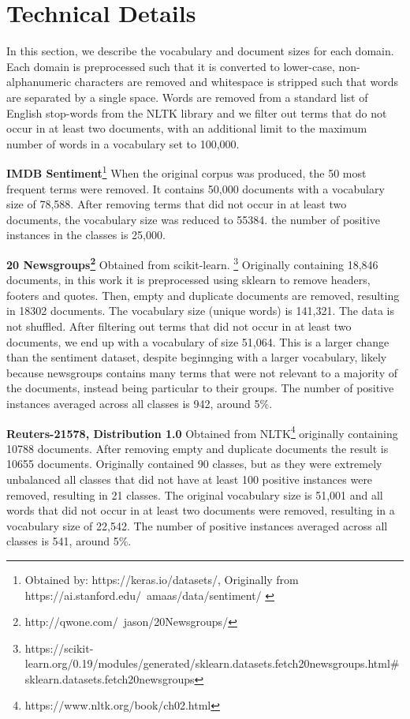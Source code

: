 \section{Technical Details}\label{ch2.5:technical}

In this section, we describe the vocabulary and document sizes for each domain. Each domain is preprocessed such that it is converted to lower-case,  non-alphanumeric characters are removed and whitespace is stripped such that words are separated by a single space. Words are removed from a standard list of English stop-words from the NLTK library \cite{Bird} and we filter out terms that do not occur in at least two documents, with an additional limit to the maximum number of words in a vocabulary set to 100,000. 


\textbf{IMDB Sentiment}\footnote{Obtained by: https://keras.io/datasets/, Originally from https://ai.stanford.edu/~amaas/data/sentiment/ \cite{Maas2011a}} When the original corpus was produced, the 50 most frequent terms were removed. It contains 50,000 documents with a vocabulary size of 78,588. After removing terms that did not occur in at least two documents, the vocabulary size was reduced to 55384.  the number of positive instances in the classes is 25,000.


\textbf{20 Newsgroups\footnote{http://qwone.com/~jason/20Newsgroups/}} Obtained from scikit-learn. \footnote{https://scikit-learn.org/0.19/modules/generated/sklearn.datasets.fetch\textunderscore20newsgroups.html\#sklearn.datasets.fetch\textunderscore20newsgroups} Originally containing 18,846 documents, in this work it is preprocessed using sklearn to remove headers, footers and quotes. Then, empty and duplicate documents are removed, resulting in 18302 documents. The vocabulary size (unique words) is 141,321. The data is not shuffled. After filtering out terms that did not occur in at least two documents, we end up with a vocabulary of size 51,064. This is a larger change  than the sentiment dataset, despite beginnging with a larger vocabulary, likely because newsgroups contains many terms that were not relevant to a majority of the documents, instead being particular to their groups. The number of positive instances averaged across all classes is 942, around 5\%.

\textbf{Reuters-21578, Distribution 1.0} Obtained from NLTK\footnote{https://www.nltk.org/book/ch02.html} originally containing 10788 documents. After removing empty and duplicate documents the result is 10655 documents. Originally contained 90 classes, but as they were extremely unbalanced all classes that did not have at least 100 positive instances were removed, resulting in 21 classes. The original vocabulary size is 51,001 and all words that did not occur in at least two documents were removed, resulting in a vocabulary size of 22,542. The number of positive instances averaged across all classes is 541, around 5\%. 

